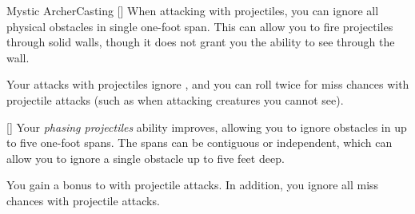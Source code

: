 \begin{feat}{Mystic Archer}{Casting}
        [] When attacking with projectiles, you can ignore all physical obstacles in single one-foot span.
        This can allow you to fire projectiles through solid walls, though it does not grant you the ability to see through the wall.

         Your attacks with projectiles ignore , and you can roll twice for miss chances with projectile attacks (such as when attacking creatures you cannot see).

        [] Your \textit{phasing projectiles} ability improves, allowing you to ignore obstacles in up to five one-foot spans.
        The spans can be contiguous or independent, which can allow you to ignore a single obstacle up to five feet deep.

         You gain a  bonus to  with projectile attacks.
        In addition, you ignore all miss chances with projectile attacks.
    \end{feat}

